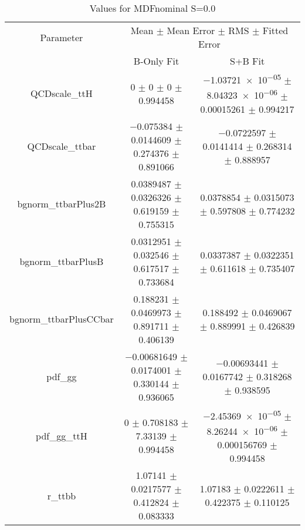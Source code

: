 \begin{table}
\centering
\caption{Values for MDFnominal S=0.0}
\begin{tabular}{ccc}
\toprule
Parameter & \multicolumn{2}{c}{Mean $\pm$ Mean Error $\pm$ RMS $\pm$ Fitted Error}\\
 & B-Only Fit & S+B Fit\\
\midrule
QCDscale\_ttH & \num{0} $\pm$ \num{0} $\pm$ \num{0} $\pm$ \num{0.994458} & \num{-1.03721e-05} $\pm$ \num{8.04323e-06} $\pm$ \num{0.00015261} $\pm$ \num{0.994217}\\
QCDscale\_ttbar & \num{-0.075384} $\pm$ \num{0.0144609} $\pm$ \num{0.274376} $\pm$ \num{0.891066} & \num{-0.0722597} $\pm$ \num{0.0141414} $\pm$ \num{0.268314} $\pm$ \num{0.888957}\\
bgnorm\_ttbarPlus2B & \num{0.0389487} $\pm$ \num{0.0326326} $\pm$ \num{0.619159} $\pm$ \num{0.755315} & \num{0.0378854} $\pm$ \num{0.0315073} $\pm$ \num{0.597808} $\pm$ \num{0.774232}\\
bgnorm\_ttbarPlusB & \num{0.0312951} $\pm$ \num{0.032546} $\pm$ \num{0.617517} $\pm$ \num{0.733684} & \num{0.0337387} $\pm$ \num{0.0322351} $\pm$ \num{0.611618} $\pm$ \num{0.735407}\\
bgnorm\_ttbarPlusCCbar & \num{0.188231} $\pm$ \num{0.0469973} $\pm$ \num{0.891711} $\pm$ \num{0.406139} & \num{0.188492} $\pm$ \num{0.0469067} $\pm$ \num{0.889991} $\pm$ \num{0.426839}\\
pdf\_gg & \num{-0.00681649} $\pm$ \num{0.0174001} $\pm$ \num{0.330144} $\pm$ \num{0.936065} & \num{-0.00693441} $\pm$ \num{0.0167742} $\pm$ \num{0.318268} $\pm$ \num{0.938595}\\
pdf\_gg\_ttH & \num{0} $\pm$ \num{0.708183} $\pm$ \num{7.33139} $\pm$ \num{0.994458} & \num{-2.45369e-05} $\pm$ \num{8.26244e-06} $\pm$ \num{0.000156769} $\pm$ \num{0.994458}\\
r\_ttbb & \num{1.07141} $\pm$ \num{0.0217577} $\pm$ \num{0.412824} $\pm$ \num{0.083333} & \num{1.07183} $\pm$ \num{0.0222611} $\pm$ \num{0.422375} $\pm$ \num{0.110125}\\
\bottomrule
\end{tabular}
\end{table}